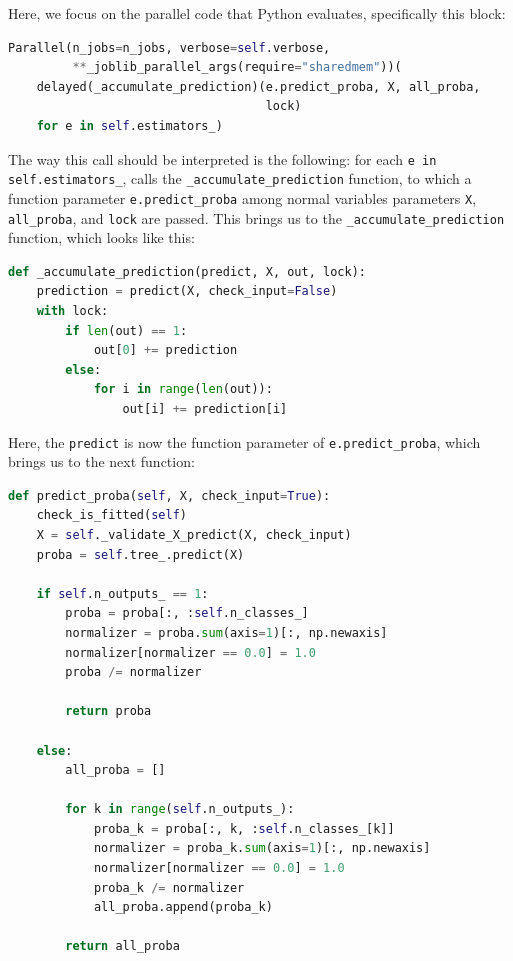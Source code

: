\documentclass{IEEEtran}
\begin{document}
Here, we focus on the parallel code that Python evaluates, specifically this block:

\begin{lstlisting}[language=Python]
Parallel(n_jobs=n_jobs, verbose=self.verbose,
         **_joblib_parallel_args(require="sharedmem"))(
    delayed(_accumulate_prediction)(e.predict_proba, X, all_proba,
                                    lock)
    for e in self.estimators_)
\end{lstlisting}

The way this call should be interpreted is the following: for each \verb|e in self.estimators_|, calls the \verb|_accumulate_prediction| function, to which a function parameter \verb|e.predict_proba| among normal variables parameters \verb|X|, \verb|all_proba|, and \verb|lock| are passed. This brings us to the \verb|_accumulate_prediction| function, which looks like this:

\begin{lstlisting}[language=Python]
def _accumulate_prediction(predict, X, out, lock):
    prediction = predict(X, check_input=False)
    with lock:
        if len(out) == 1:
            out[0] += prediction
        else:
            for i in range(len(out)):
                out[i] += prediction[i]
\end{lstlisting}

Here, the \verb|predict| is now the function parameter of \verb|e.predict_proba|, which brings us to the next function:

\begin{lstlisting}[language=Python]
def predict_proba(self, X, check_input=True):
    check_is_fitted(self)
    X = self._validate_X_predict(X, check_input)
    proba = self.tree_.predict(X)
    
    if self.n_outputs_ == 1:
        proba = proba[:, :self.n_classes_]
        normalizer = proba.sum(axis=1)[:, np.newaxis]
        normalizer[normalizer == 0.0] = 1.0
        proba /= normalizer
    
        return proba
    
    else:
        all_proba = []
    
        for k in range(self.n_outputs_):
            proba_k = proba[:, k, :self.n_classes_[k]]
            normalizer = proba_k.sum(axis=1)[:, np.newaxis]
            normalizer[normalizer == 0.0] = 1.0
            proba_k /= normalizer
            all_proba.append(proba_k)
    
        return all_proba
\end{lstlisting}
\end{document}
